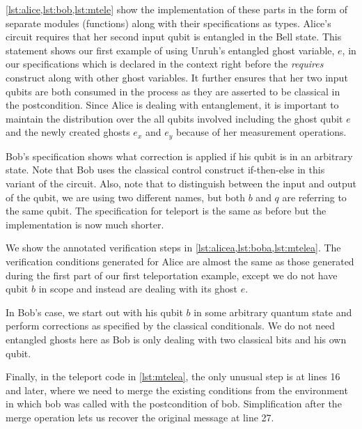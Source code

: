\documentclass[adraft,creativecommons]{eptcs}
\theoremstyle{definition}
\theoremstyle{remark}
\begin{document}
\cref{lst:alice,lst:bob,lst:mtele} show the implementation of these parts in the form of separate modules (functions) along with their specifications as types. Alice's circuit requires that her second input qubit is entangled in the Bell state. This statement shows our first example of using Unruh's entangled ghost variable, $e$, in our specifications which is declared in the context right before the \textit{requires} construct along with other ghost variables. It further ensures that her two input qubits are both consumed in the process as they are asserted to be classical in the postcondition. Since Alice is dealing with entanglement, it is important to maintain the distribution over the all qubits involved including the ghost qubit $e$ and the newly created ghosts $e_x$ and $e_y$ because of her measurement operations.

Bob's specification shows what correction is applied if his qubit is in an arbitrary state. Note that Bob uses the classical control construct if-then-else in this variant of the circuit. Also, note that to distinguish between the input and output of the qubit, we are using two different names, but both $b$ and $q$ are referring to the same qubit. The specification for teleport is the same as before but the implementation is now much shorter.

We show the annotated verification steps in \cref{lst:alicea,lst:boba,lst:mtelea}. The verification conditions generated for Alice are almost the same as those generated during the first part of our first teleportation example, except we do not have qubit $b$ in scope and instead are dealing with its ghost $e$.

In Bob's case, we start out with his qubit $b$ in some arbitrary quantum state and perform corrections as specified by the classical conditionals. We do not need entangled ghosts here as Bob is only dealing with two classical bits and his own qubit.

Finally, in the teleport code in \cref{lst:mtelea}, the only unusual step is at lines 16 and later, where we need to merge the existing conditions from the environment in which bob was called with the postcondition of bob. Simplification after the merge operation lets us recover the original message at line 27.




\end{document}
